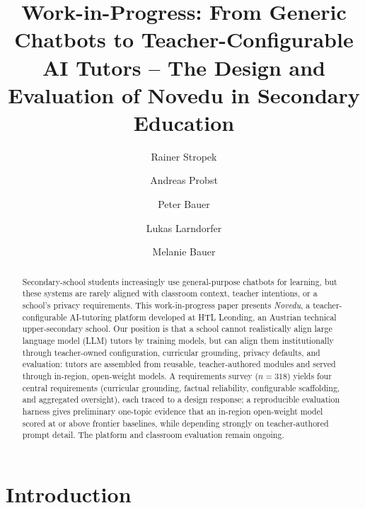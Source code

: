 \documentclass[runningheads]{llncs}
\begin{document}
\title{Work-in-Progress: From Generic Chatbots to Teacher-Configurable AI Tutors -- The Design and Evaluation of Novedu in Secondary Education}

\author{Rainer Stropek \and Andreas Probst \and Peter Bauer \and Lukas Larndorfer \and Melanie Bauer}


\maketitle

\begin{abstract}
Secondary-school students increasingly use general-purpose chatbots for learning, but these systems are rarely aligned with classroom context, teacher intentions, or a school's privacy requirements. This work-in-progress paper presents \emph{Novedu}, a teacher-configurable AI-tutoring platform developed at HTL Leonding, an Austrian technical upper-secondary school. Our position is that a school cannot realistically align large language model (LLM) tutors by training models, but can align them institutionally through teacher-owned configuration, curricular grounding, privacy defaults, and evaluation: tutors are assembled from reusable, teacher-authored modules and served through in-region, open-weight models. A requirements survey ($n=318$) yields four central requirements (curricular grounding, factual reliability, configurable scaffolding, and aggregated oversight), each traced to a design response; a reproducible evaluation harness gives preliminary one-topic evidence that an in-region open-weight model scored at or above frontier baselines, while depending strongly on teacher-authored prompt detail. The platform and classroom evaluation remain ongoing.
\end{abstract}

\section{Introduction}
\label{sec:intro}
\end{document}

